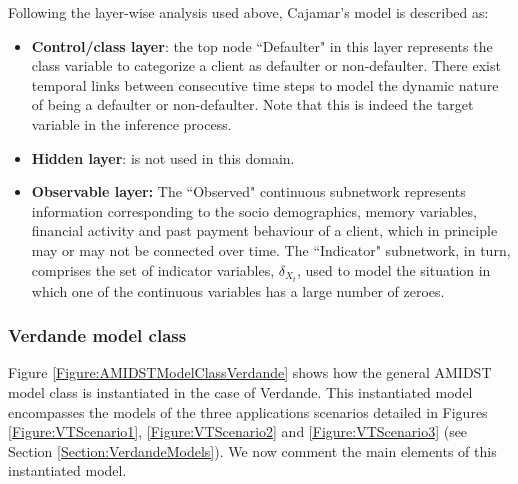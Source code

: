 Following the layer-wise analysis used above, Cajamar's model is described as:
\begin{itemize}

\item \textbf{Control/class layer}: the top node ``Defaulter" in this layer represents the class variable to categorize a client as defaulter or non-defaulter. There exist temporal links between consecutive time steps to model the dynamic nature of being a defaulter or non-defaulter. Note that this is indeed the target variable in the inference process.

\item \textbf{Hidden layer}: is not used in this domain.

\item \textbf{Observable layer:} The ``Observed" continuous subnetwork represents information corresponding to the socio demographics, memory variables, financial activity and past payment behaviour of a client, which in principle may or may not be connected over time. The ``Indicator" subnetwork, in turn, comprises the set of indicator variables, $\delta_{X_t}$, used to model the situation in which one of the continuous variables has a large number of zeroes.

\end{itemize}



\subsubsection{Verdande model class}\label{verdandeAMIDSTModels}

Figure \ref{Figure:AMIDSTModelClassVerdande} shows how the general AMIDST model class is instantiated in the case of Verdande. This instantiated model encompasses the models of the three applications scenarios detailed in Figures \ref{Figure:VTScenario1}, \ref{Figure:VTScenario2} and \ref{Figure:VTScenario3}  (see Section \ref{Section:VerdandeModels}).  We now comment the main elements of this instantiated model.


